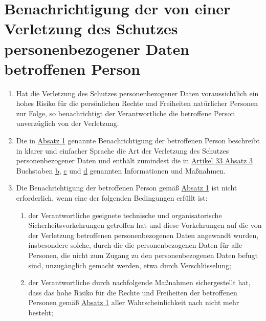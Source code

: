 \chapter{Benachrichtigung der von einer Verletzung des Schutzes personenbezogener Daten betroffenen Person}
\label{ch:34}


\begin{enumerate}

  \item Hat die Verletzung des Schutzes personenbezogener Daten voraussichtlich ein hohes Risiko für die persönlichen
   Rechte und Freiheiten natürlicher Personen zur Folge, so benachrichtigt der Verantwortliche die betroffene Person
   unverzüglich von der Verletzung.
  \label{itm:34-1}

  \item Die in \hyperref[itm:34-1]{Absatz 1} genannte Benachrichtigung der betroffenen Person beschreibt in klarer und
   einfacher Sprache die Art der Verletzung des Schutzes personenbezogener Daten und enthält zumindest die in
   \hyperref[itm:33-3]{Artikel 33 Absatz 3} Buchstaben \hyperref[itm:33-3b]{b}, \hyperref[itm:33-3c]{c} und \hyperref
    [itm:33-3d]{d} genannten Informationen und Maßnahmen.
  \label{itm:34-2}

  \item Die Benachrichtigung der betroffenen Person gemäß \hyperref[itm:34-1]{Absatz 1} ist nicht erforderlich, wenn eine der folgenden
   Bedingungen erfüllt ist:
  \label{itm:34-3}

  \begin{enumerate}
  
    \item der Verantwortliche geeignete technische und organisatorische Sicherheitsvorkehrungen getroffen hat und diese
     Vorkehrungen auf die von der Verletzung betroffenen personenbezogenen Daten angewandt wurden, insbesondere solche,
     durch die die personenbezogenen Daten für alle Personen, die nicht zum Zugang zu den personenbezogenen Daten
     befugt sind, unzugänglich gemacht werden, etwa durch Verschlüsselung;
    \label{itm:34-3a}

    \item der Verantwortliche durch nachfolgende Maßnahmen sichergestellt hat, dass das hohe Risiko für die Rechte und
     Freiheiten der betroffenen Personen gemäß \hyperref[itm:34-1]{Absatz 1} aller Wahrscheinlichkeit nach nicht mehr
     besteht;
    \label{itm:34-3b}


\end{enumerate}
\end{enumerate}
